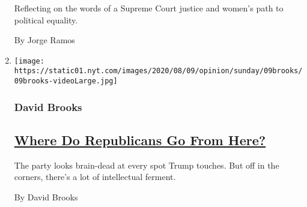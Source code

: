 \begin{enumerate}
  Reflecting on the words of a Supreme Court justice and women's path to
  political equality.

  By Jorge Ramos
\item
  \texttt{[image: https://static01.nyt.com/images/2020/08/09/opinion/sunday/09brooks/09brooks-videoLarge.jpg]}

  \hypertarget{david-brooks}{%
  \subsubsection{David Brooks}\label{david-brooks}}

  \hypertarget{where-do-republicans-go-from-here}{%
  \subsection{\texorpdfstring{\href{/2020/08/07/opinion/sunday/republican-party-trump-2020.html}{Where
  Do Republicans Go From
  Here?}}{Where Do Republicans Go From Here?}}\label{where-do-republicans-go-from-here}}

  The party looks brain-dead at every spot Trump touches. But off in the
  corners, there's a lot of intellectual ferment.

  By David Brooks
\end{enumerate}

